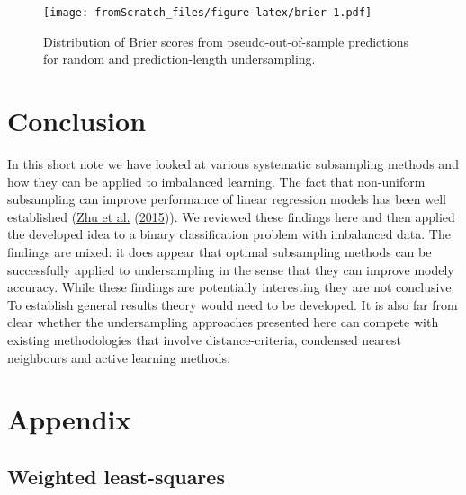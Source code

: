 \documentclass[
]{book}
\begin{document}
\begin{figure}
\centering
\texttt{[image: fromScratch\_files/figure-latex/brier-1.pdf]}
\caption{\label{fig:brier}Distribution of Brier scores from pseudo-out-of-sample predictions for random and prediction-length undersampling.}
\end{figure}

\hypertarget{concl}{%
\section{Conclusion}\label{concl}}

In this short note we have looked at various systematic subsampling methods and how they can be applied to imbalanced learning. The fact that non-uniform subsampling can improve performance of linear regression models has been well established (\protect\hyperlink{ref-zhu2015optimal}{Zhu et al.} (\protect\hyperlink{ref-zhu2015optimal}{2015})). We reviewed these findings here and then applied the developed idea to a binary classification problem with imbalanced data. The findings are mixed: it does appear that optimal subsampling methods can be successfully applied to undersampling in the sense that they can improve modely accuracy. While these findings are potentially interesting they are not conclusive. To establish general results theory would need to be developed. It is also far from clear whether the undersampling approaches presented here can compete with existing methodologies that involve distance-criteria, condensed nearest neighbours and active learning methods.

\hypertarget{appendix}{%
\section*{Appendix}\label{appendix}}

\hypertarget{app-wls}{%
\subsection*{Weighted least-squares}\label{app-wls}}
\end{document}

